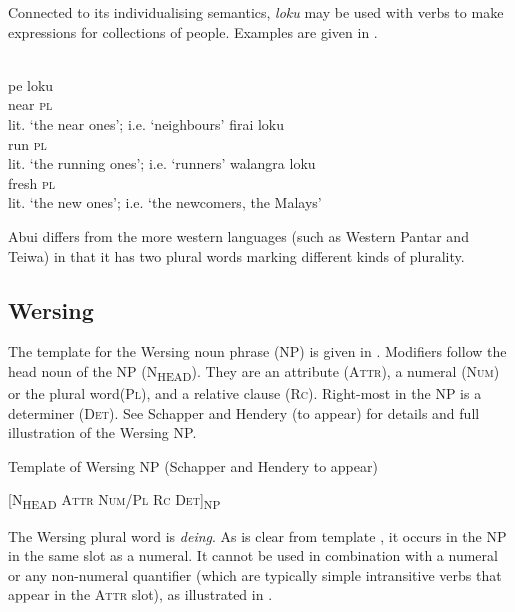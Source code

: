 Connected to its individualising semantics, \textit{loku} may be used with verbs to make expressions for collections of people. Examples are given in .


\ea%
\label{ex:9:54}
\ea
{} \\
\gll pe loku  \\
   near \textsc{pl}  \\
\glt lit. `the near ones'; i.e. `neighbours'
\ex
\gll firai loku \\
  run \textsc{pl}   \\
 \glt lit. `the running ones'; i.e. `runners'
\glt
\ex
\gll walangra loku \\
   fresh \textsc{pl}  \\
\glt  lit. `the new ones'; i.e. `the newcomers, the Malays'
\z
\z






Abui differs from the more western languages (such as Western Pantar and Teiwa) in that it has two plural words marking different kinds of plurality.

\subsection{Wersing} %
\label{sec:9:3.5}
The template for the Wersing noun phrase (NP) is given in . Modifiers follow the head noun of the NP (\textsc{N}\textsubscript{\MakeUppercase{head}}). They are an attribute (\textsc{Attr}), a numeral (\textsc{Num}) or the plural word\textsc{(Pl),} and a relative clause (\textsc{Rc).} \textsc{R}ight-most in the NP is a determiner (\textsc{Det}). See Schapper and Hendery (to appear) for details and full illustration of the Wersing NP.

\ea%
\label{ex:9:55}
 Template of Wersing NP (Schapper and Hendery to appear)

  [\textsc{N}\textsubscript{\MakeUppercase{head } }\textsc{Attr Num/Pl  Rc  Det]}\textsc{\textsubscript{NP}}
\z


The Wersing plural word is \textit{deing}. As is clear from template , it occurs in the NP in the same slot as a numeral. It cannot be used in combination with a numeral or any non-numeral quantifier (which are typically simple intransitive verbs that appear in the \textsc{Attr} slot), as illustrated in .


